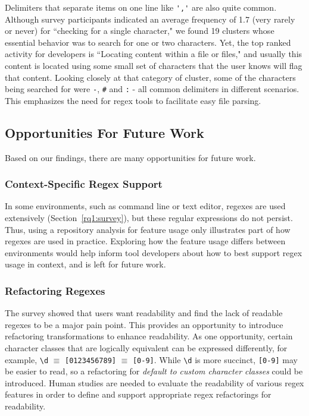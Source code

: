 Delimiters that separate items on one line like \verb!','! are also quite common.  Although survey participants indicated an average frequency of 1.7 (very rarely or never) for ``checking for a single character," we found 19 clusters whose essential behavior was to search for one or two characters.   
Yet, the top ranked activity for developers is ``Locating content within a file or files," and usually this content is located using some small set of characters that the user knows will flag that content.  Looking closely at that category of cluster, some of the characters being searched for were \verb!-!, \verb!#! and \verb!:! - all common delimiters in different scenarios. This emphasizes the need for regex tools to  facilitate easy file parsing. 



\subsection{Opportunities For Future Work}

Based on our findings, there are many opportunities for future work.



\subsubsection{Context-Specific Regex Support}
In some environments, such as command line or text editor, regexes are used extensively (Section~\ref{rq1:survey}), but these regular expressions do not persist. Thus, using a repository analysis for feature usage only illustrates part of how regexes are used in practice. Exploring how the feature usage differs between environments would help inform tool developers about how to best support regex usage in context, and is left for future work.  

\subsubsection{Refactoring Regexes}
The survey showed that users want readability and find the lack of readable regexes to be a major pain point.  
This provides an opportunity to introduce refactoring transformations to enhance readability. 
As one opportunity, certain character classes that are logically equivalent can be expressed differently, for example, \verb!\d! $\equiv$ \verb![0123456789]! $\equiv$ \verb![0-9]!. While \verb!\d! is more succinct, \verb![0-9]! may be easier to read, so a refactoring for \emph{default to custom character classes} could be introduced. 
Human studies are needed to evaluate the readability of various regex features in order to define and support appropriate regex refactorings for readability. 

